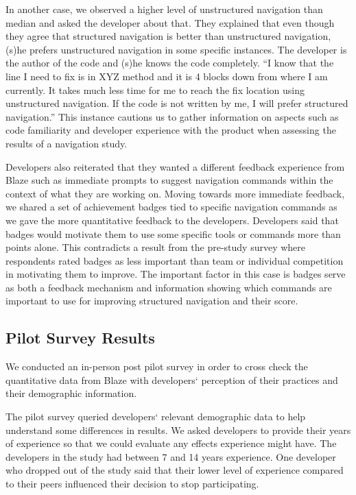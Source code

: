 \documentclass{sig-alternate}
\begin{document}
In another case, we observed a higher level of unstructured navigation than median and asked the developer about that.  They explained that even though they agree that structured navigation is better than unstructured navigation, (s)he prefers unstructured navigation in some specific instances. The developer is the author of the code and (s)he knows the code completely. ``I know that the line I need to fix is in XYZ method and it is 4 blocks down from where I am currently. It takes much less time for me to reach the fix location using unstructured navigation. If the code is not written by me, I will prefer structured navigation.'' This instance cautions us to gather information on aspects such as code familiarity and developer experience with the product when assessing the results of a navigation study.


Developers also reiterated that they wanted a different feedback experience from Blaze  such as immediate prompts to suggest navigation commands within the context of what they are working on.  Moving towards more immediate feedback, we shared a set of achievement badges tied to specific navigation commands  as we gave the more quantitative feedback to the developers.   Developers said that badges would motivate them to use some specific tools or commands more than points alone.   This contradicts a result from the pre-study survey where respondents rated badges as less important than team or individual competition in motivating them to improve.  The important factor in this case is badges serve as both a feedback mechanism and information showing which commands are important to use for improving structured navigation and their score.

\subsection{Pilot Survey Results}

We conducted an in-person post pilot survey in order to cross check the quantitative data from Blaze with developers` perception of their practices and their demographic information.

The pilot survey queried developers` relevant demographic data to help understand some differences in results.  We asked developers to provide their years of experience so that we could evaluate any effects experience might have.  The developers in the study had between 7 and 14 years experience.  One developer who dropped out of the study said that their lower level of experience compared to their peers influenced their decision to stop participating.  
\end{document}
